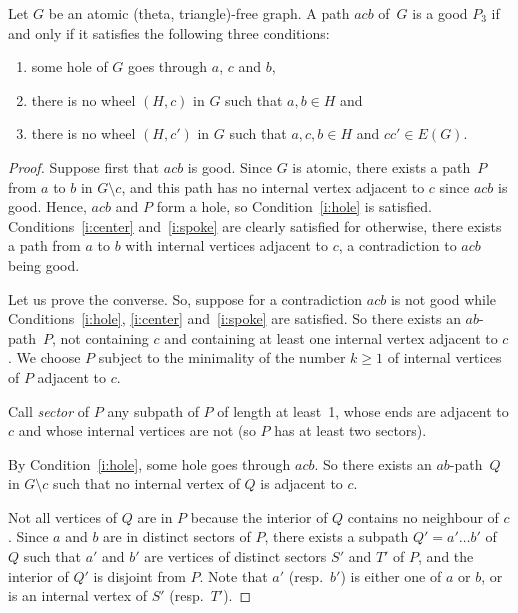 \documentclass[10pt,a4paper]{amsart}
\newcommand{\sm}{\setminus}
\begin{document}
\begin{lemma}
  \label{l:goodEquiv}
  Let $G$ be an atomic (theta, triangle)-free graph.
  A path $acb$ of~$G$ is a good $P_3$ if and only if it satisfies the following three conditions:    
  \begin{enumerate}
  \item\label{i:hole} some hole of $G$ goes through $a$, $c$ and $b$, 
  \item\label{i:center}  there is no wheel $(H, c)$ in $G$ such that $a, b \in H$ and
  \item\label{i:spoke} there is no wheel $(H, c')$ in $G$ such that $a, c, b \in H$ and $cc'\in E(G)$.
  \end{enumerate}
\end{lemma}

\begin{proof}
  Suppose first that $acb$ is good.  Since $G$ is atomic, there exists a path~$P$ from $a$ to $b$ in $G\sm c$, and this path has no internal vertex adjacent to $c$ since $acb$ is good. Hence, $acb$ and $P$ form a hole, so Condition~\ref{i:hole} is satisfied.  Conditions~\ref{i:center} and~\ref{i:spoke} are clearly satisfied for otherwise, there exists a path from $a$ to $b$ with internal vertices adjacent to $c$, a contradiction to $acb$ being good. 
  
  Let us prove the converse. So, suppose for a contradiction $acb$ is not good while Conditions~\ref{i:hole}, \ref{i:center} and~\ref{i:spoke} are satisfied. 
  So there exists an $ab$-path~$P$, not containing $c$ and containing at least one internal vertex adjacent to $c$.  We choose $P$ subject to the minimality of the  number $k\geq 1$ of internal vertices of $P$ adjacent to $c$.   
  
  Call \emph{sector} of $P$ any subpath of $P$ of length at least~1, whose ends are adjacent to $c$ and whose internal vertices are not (so $P$ has at least two sectors). 
  
  By Condition~\ref{i:hole}, some hole goes through $acb$. So there exists an $ab$-path~$Q$ in $G\sm c$ such that no internal vertex of $Q$ is adjacent to $c$. 
  
  Not all vertices of $Q$ are in $P$ because the interior of $Q$ contains no neighbour of $c$. 
  Since $a$ and $b$ are in distinct sectors of $P$, there exists a subpath $Q'= a'\dots b'$ of $Q$ such that $a'$ and $b'$ are vertices of distinct sectors $S'$ and $T'$ of $P$, and the interior of $Q'$ is disjoint from $P$. Note that $a'$ (resp.\ $b'$) is either one of $a$ or $b$, or is an internal vertex of $S'$ (resp.\ $T'$). 


\end{proof}
\end{document}
